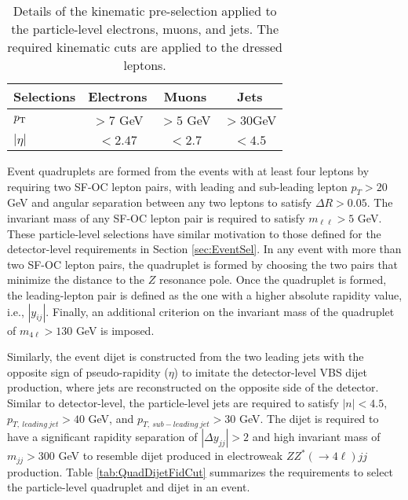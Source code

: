 \begin{table}[!htbp]
    \centering
    \caption{Details of the kinematic pre-selection applied to the particle-level electrons, muons, and jets. The required kinematic cuts are applied to the dressed leptons.
    \label{tab:FidObjectCut}}
    \begin{tabular}{|| l || c | c | c ||}
        \hline
        Selections      & Electrons             &       Muons        &          Jets            \\
        \hline\hline
        $p_{\textrm{T} ~}$          & $> 7$ GeV             &       $ >5$ GeV    &      $>30$GeV        \\
        \hline 
        $|\eta|$            &  $< 2.47  $           &       $ < 2.7 $        &      $ < 4.5$            \\
        \hline
    \end{tabular}
\end{table}  

Event quadruplets are formed from the events with at least four leptons by requiring two SF-OC lepton pairs, with leading and sub-leading lepton $p_{T}>20$ GeV and angular separation between any two leptons to satisfy $\Delta R > 0.05$. The invariant mass of any SF-OC lepton pair is required to satisfy $m_{\ell \ell } > 5$ GeV. These particle-level selections have similar motivation to those defined for the detector-level requirements in Section \ref{sec:EventSel}. In any event with more than two SF-OC lepton pairs, the quadruplet is formed by choosing the two pairs that minimize the distance to the $Z$ resonance pole. Once the quadruplet is formed, the leading-lepton pair is defined as the one with a higher absolute rapidity value, i.e., $|y_{ij}|$. Finally, an additional criterion on the invariant mass of the quadruplet of $m_{4\ell} > 130$ GeV is imposed. 

Similarly, the event dijet is constructed from the two leading jets with the opposite sign of pseudo-rapidity ($\eta$) to imitate the detector-level VBS dijet production, where jets are reconstructed on the opposite side of the detector. Similar to detector-level, the particle-level jets are required to satisfy $|n| < 4.5$, $p_{T,~leading~jet} > 40$ GeV, and $p_{T,~sub-leading~jet} > 30$ GeV. The dijet is required to have a significant rapidity separation of $|\Delta y_{jj}| > 2$ and high invariant mass of $m_{jj} > 300$ GeV to resemble dijet produced in electroweak $ZZ^*(\rightarrow 4 \ell) jj$ production. Table \ref{tab:QuadDijetFidCut} summarizes the requirements to select the particle-level quadruplet and dijet in an event.           
    
